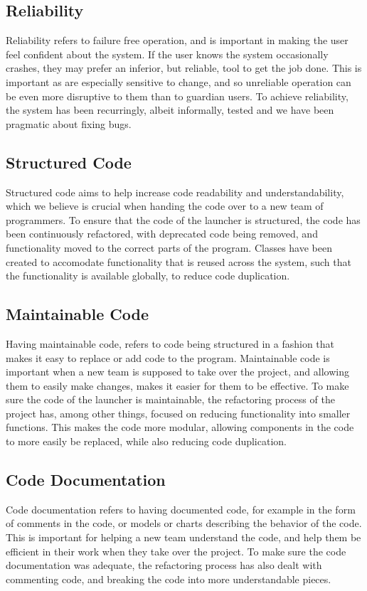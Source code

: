 \subsection{Reliability}
Reliability refers to failure free operation, and is important in making the user feel confident about the system. 
If the user knows the system occasionally crashes, they may prefer an inferior, but reliable, tool to get the job done. 
This is important as \autists[] are especially sensitive to change, and so unreliable operation can be even more disruptive to them than to guardian users. 
To achieve reliability, the system has been recurringly, albeit informally, tested and we have been pragmatic about fixing bugs.

\subsection{Structured Code}
Structured code aims to help increase code readability and understandability, which we believe is crucial when handing the code over to a new team of programmers. 
To ensure that the code of the launcher is structured, the code has been continuously refactored, with deprecated code being removed, and functionality moved to the correct parts of the program. 
Classes have been created to accomodate functionality that is reused across the system, such that the functionality is available globally, to reduce code duplication. 

\subsection{Maintainable Code}
Having maintainable code, refers to code being structured in a fashion that makes it easy to replace or add code to the program. 
Maintainable code is important when a new team is supposed to take over the project, and allowing them to easily make changes, makes it easier for them to be effective. 
To make sure the code of the launcher is maintainable, the refactoring process of the project has, among other things, focused on reducing functionality into smaller functions. 
This makes the code more modular, allowing components in the code to more easily be replaced, while also reducing code duplication. 

\subsection{Code Documentation}
Code documentation refers to having documented code, for example in the form of comments in the code, or models or charts describing the behavior of the code. 
This is important for helping a new team understand the code, and help them be efficient in their work when they take over the project. 
To make sure the code documentation was adequate, the refactoring process has also dealt with commenting code, and breaking the code into more understandable pieces. 

